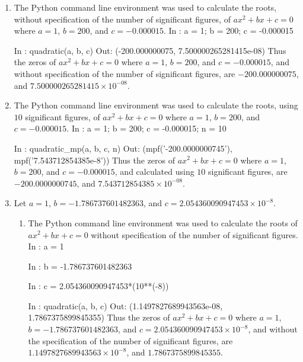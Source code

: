 \documentclass[12pt]{article}
\newenvironment{qv}
{\quote\Verbatim}
{\endVerbatim\endquote}
\begin{document}
\begin{enumerate}[\ (a)\ ]
\item {}
The Python command line environment was used to calculate the roots, without specification of the number of significant figures, of $ax^2 + bx + c = 0$ where $a = 1$, $b = 200$, and $c = -0.000015$.
\begin{qv}
In : a = 1; b = 200; c = -0.000015

In : quadratic(a, b, c)
Out: (-200.000000075, 7.500000265281415e-08)
\end{qv}
Thus the zeros of $ax^2 + bx + c = 0$ where $a = 1$, $b = 200$, and $c = -0.000015$, and without specification of the number of significant figures, are $\boxed{-200.000000075}$, and $\boxed{7.500000265281415\times 10^{-08}}$.

\item {}
The Python command line environment was used to calculate the roots, using $10$ significant figures, of $ax^2 + bx + c = 0$ where $a = 1$, $b = 200$, and $c = -0.000015$.
\begin{qv}
In : a = 1; b = 200; c = -0.000015; n = 10

In : quadratic_mp(a, b, c, n)
Out: (mpf('-200.0000000745'), mpf('7.543712854385e-8'))
\end{qv}
Thus the zeros of $ax^2 + bx + c = 0$ where $a = 1$, $b = 200$, and $c = -0.000015$, and calculated using $10$ significant figures, are $\boxed{-200.0000000745}$, and $\boxed{7.543712854385\times 10^{-08}}$.

\item {}
Let $a = 1$, $b = -1.786737601482363$, and $c = 2.054360090947453\times 10^{-8}$.
\begin{enumerate}[\ (i) \ ]
\item The Python command line environment was used to calculate the roots of $ax^2 + bx + c = 0$ without specification of the number of significant figures.
\begin{qv}
In : a = 1

In : b = -1.786737601482363

In : c = 2.054360090947453*(10**(-8))

In : quadratic(a, b, c)
Out: (1.1497827689943563e-08, 1.7867375899845355)
\end{qv}
Thus the zeros of $ax^2 + bx + c = 0$ where $a = 1$, $b = -1.786737601482363$, and $c = 2.054360090947453\times 10^{-8}$, and without the specification of the number of significant figures, are $\boxed{1.1497827689943563\times 10^{-8}}$, and $\boxed{1.7867375899845355}$.


\end{enumerate}
\end{enumerate}
\end{document}
